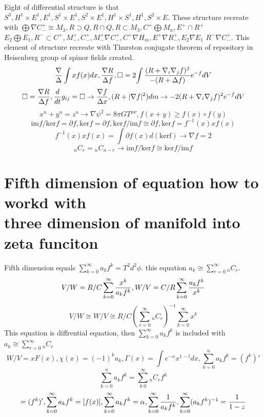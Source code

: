 \documentclass{jsarticle}
\begin{document}
  Eight of differential structure is that $ S^3, H^1 \times E^1, E^1, S^1 \times E^1, S^2 \times E^1, H^1 \times S^1, 
  H^1, S^2 \times E$.  
  These structure recreate with $ \bigoplus \nabla C^{+}_{-} \cong M_3, R \supset Q, R \cap Q, R \subset M_3, C^{+} \bigoplus M_n, E^{+} \cap R^{+}$
  $ E_2 \bigoplus E_1, R^{-} \subset C^{+}, M^{+}_{-}, C^{+}_{-}, M^{+}_{-}\nabla C^{+}_{-}, C^{+}\nabla H_m, E^{+} \nabla R^{+}_{-}, E_2 \nabla E_1 $
  $ R^{-} \nabla C^{+}_{-} $. This element of structure recreate with Thurston conjugate theorem of repository in Heisenberg group of spinor fields created.
  $$ {\nabla \over \Delta} \int x f(x) dx, {\nabla R \over \Delta f}, \square = 2{\int {(R + \nabla_{i} \nabla_{j} f)^2
  \over -(R + \Delta f)}}e^{-f}dV $$
  $$ \square = {\nabla R \over \Delta f}, {d \over dt}g_{ij} = \square \to {\nabla f \over \Delta x}, (R + 
  |\nabla f|^2)dm \to -2(R + \nabla_{i} \nabla_{j} f)^2 e^{-f}dV $$
  $$ x^n + y^n = z^n \to \nabla \psi^2 = 8 \pi G T^{\mu\nu}, f(x + y) \ge f(x) \circ f(y) $$
  $$ \mathrm{im}f / \mathrm{ker}f = \partial f, \mathrm{ker}f = \partial f, \mathrm{ker}f / \mathrm{im}f \cong
  \partial f, \mathrm{ker}f = f^{-1}(x)xf(x) $$
  $$ f^{-1}(x)xf(x) = \int \partial f(x) d(\mathrm{kerf}) \to \nabla f = 2 $$
  $$ _{n}C_{r} = {}_{n}C_{n-r}  \to \mathrm{im}f / \mathrm{ker}f \cong \mathrm{ker}f / \mathrm{im}f $$

  \section{Fifth dimension of equation how to workd with \\
	  three dimension of manifold into zeta funciton}
  

  Fifth dimension equals $ \sum^{\infty}_{k=0}a_k f^k = T^2d^2 \phi $. this equation $ a_k \cong \sum^{\infty}_{r=0} {}_n C_r $.
  $$ V/W = R/C \sum^{\infty}_{k=0}{x^k \over a_k f^k}, W/V = C/R \sum^{\infty}_{k=0}{a_k f^k \over x^k} $$
  $$ V/W \cong W/V \cong R/C(\sum^{\infty}_{r=0} {}_nC_{r})^{-1} \sum^{\infty}_{k=0} x^k $$
  This equation is diffrential equation, then $ \sum^{\infty}_{k=0} a_k f^k $ is included with $ a_k \cong \sum^{\infty}_{r=0} {}_nC_{r} $
  $$ W/V = xF(x), \chi(x) = (-1)^k a_k, \Gamma(x) = \int e^{-x} x^{1 -t}dx, \sum^{n}_{k=0}a_k f^k = (f^k)' $$
  $$ \sum^{n}_{k=0}a_k f^k = \sum^{\infty}_{k~0} {}_{n}C_{r} f^k $$
  $$ = (f^k)', 
   \sum^{\infty}_{k=0} a_k f^k = [f(x)], 
   \sum^{\infty}_{k=0} a_k f^k = \alpha, \sum^{\infty}_{k=0} {1 \over a_k f^k}, \sum^{\infty}_{k=0} (a_k f^k)^{-1} = {1 \over 1 - z} $$
\end{document}
